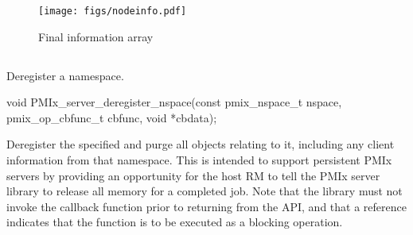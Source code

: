 \begingroup
\begin{figure*}[ht!]
  \begin{center}
    \texttt{[image: figs/nodeinfo.pdf]}
  \end{center}
  \caption{Final information array}
  \label{fig:nodeinfo}
\end{figure*}
\endgroup


\subsection{}

\summary

Deregister a namespace.

\format

\cspecificstart
\begin{codepar}
void PMIx_server_deregister_nspace(const pmix_nspace_t nspace,
                        pmix_op_cbfunc_t cbfunc, void *cbdata);
\end{codepar}
\cspecificend

\begin{arglist}
\end{arglist}

\descr

Deregister the specified  and purge all objects relating to it, including any client information from that namespace.
This is intended to support persistent \ac{PMIx} servers by providing an opportunity for the host \ac{RM} to tell the \ac{PMIx} server library to release all memory for a completed job. Note that the library must not invoke the callback function prior to returning from the \ac{API}, and that a   reference indicates that the function is to be executed as a blocking operation.


\subsection{}

